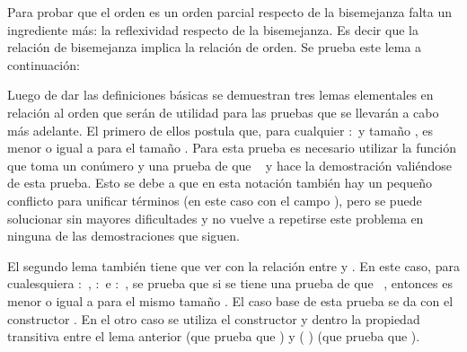 Para probar que el orden es un orden parcial respecto de la bisemejanza falta un ingrediente más: la reflexividad respecto de la bisemejanza. Es decir que la relación de bisemejanza implica la relación de orden. Se prueba este lema a continuación:

Luego de dar las definiciones básicas se demuestran tres lemas elementales en relación al orden que serán de utilidad para las pruebas que se llevarán a cabo más adelante. El primero de ellos postula que, para cualquier  $:$  y tamaño ,   es menor o igual a   para el tamaño . Para esta prueba es necesario utilizar la función  que toma un conúmero  y una prueba de que \hbox{ \AgdaFunction{$\equiv$}  } y hace la demostración valiéndose de esta prueba. Esto se debe a que en esta notación también hay un pequeño conflicto para unificar términos (en este caso con el campo ), pero se puede solucionar sin mayores dificultades y no vuelve a repetirse este problema en ninguna de las demostraciones que siguen.

El segundo lema también tiene que ver con la relación entre  y . En este caso, para cualesquiera  $:$ ,  $:$  e  $:$ , se prueba que si se tiene una prueba de que \hbox{\AgdaFunction{[}  \AgdaFunction{]}    }, entonces  es menor o igual a   para el mismo tamaño . El caso base de esta prueba se da con el constructor . En el otro caso se utiliza el constructor  y dentro la propiedad transitiva entre el lema anterior (que prueba que \AgdaFunction{[}  \AgdaFunction{]}   \AgdaFunction{$\leq$}  ) y ( ) (que prueba que \AgdaFunction{[}  \AgdaFunction{]}   \AgdaFunction{$\leq$}  ). 

